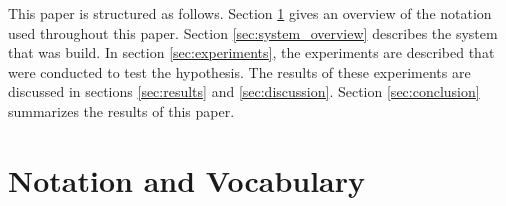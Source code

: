 \documentclass[a4paper]{article}
\begin{document}
This paper is structured as follows. Section \ref{sec:Notation and Vocabulary} gives an overview of the notation used throughout this paper. Section \ref{sec:system_overview} describes the system that was build. In section \ref{sec:experiments}, the experiments are described that were conducted to test the hypothesis. The results of these experiments are discussed in sections \ref{sec:results} and \ref{sec:discussion}. Section \ref{sec:conclusion} summarizes the results of this paper.

\section{Notation and Vocabulary}
\label{sec:Notation and Vocabulary}
\end{document}
